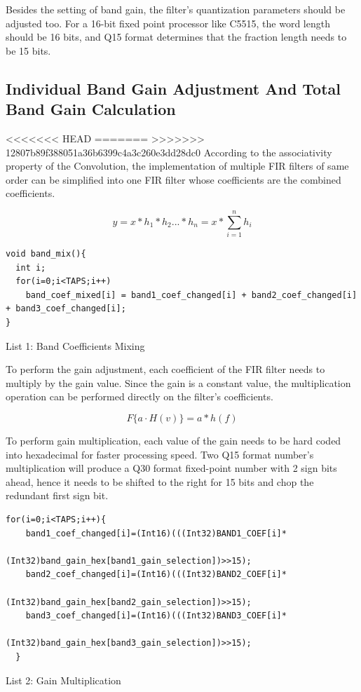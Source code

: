 \documentclass[titlepage]{article}
\begin{document}
Besides the setting of band gain, the filter's quantization parameters should
be adjusted too. For a 16-bit fixed point processor like C5515, the word
length should be 16 bits, and Q15 format determines that the fraction length
needs to be 15 bits.

\subsection{Individual Band Gain Adjustment And Total Band Gain Calculation}
<<<<<<< HEAD
\label{sec:org4c05567}
=======
\label{sec:org8db5a61}
>>>>>>> 12807b89f388051a36b6399c4a3c260e3dd28dc0
According to the associativity property of the Convolution, the
implementation of multiple FIR filters of same order can be simplified into
one FIR filter whose coefficients are the combined coefficients.

$$y = x \ast h_1 \ast h_2 ... \ast h_n = x \ast \sum\limits_{i=1}^n h_i$$

\begin{listing}
\begin{verbatim}
void band_mix(){
  int i;
  for(i=0;i<TAPS;i++)
    band_coef_mixed[i] = band1_coef_changed[i] + band2_coef_changed[i] + band3_coef_changed[i];
}
\end{verbatim}
\centering
\caption{List 1: Band Coefficients Mixing}
\newline
\end{listing}

To perform the gain adjustment, each coefficient of the FIR filter needs to
multiply by the gain value. Since the gain is a constant value, the
multiplication operation can be performed directly on the filter's
coefficients.

$$F\{a \cdot H(v)\} = a \ast h(f)$$

To perform gain multiplication, each value of the gain needs to be hard coded
into hexadecimal for faster processing speed. Two Q15 format number's
multiplication will produce a Q30 format fixed-point number with 2 sign bits
ahead, hence it needs to be shifted to the right for 15 bits and chop the
redundant first sign bit.

\begin{listing}
\begin{verbatim}
for(i=0;i<TAPS;i++){
    band1_coef_changed[i]=(Int16)(((Int32)BAND1_COEF[i]*
                          (Int32)band_gain_hex[band1_gain_selection])>>15);
    band2_coef_changed[i]=(Int16)(((Int32)BAND2_COEF[i]*
                          (Int32)band_gain_hex[band2_gain_selection])>>15);
    band3_coef_changed[i]=(Int16)(((Int32)BAND3_COEF[i]*
                          (Int32)band_gain_hex[band3_gain_selection])>>15);
  }
\end{verbatim}
\centering
\caption{List 2: Gain Multiplication}
\newline
\end{listing}
\end{document}
